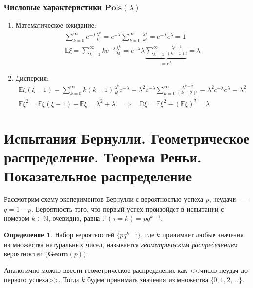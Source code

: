\documentclass[oneside,final,14pt]{extreport}
\newcommand\myprob[1]{{\mathbb{P}(#1)}}
\theoremstyle{plain}
\theoremstyle{definition}
\newtheorem*{defn}{Определение}
\theoremstyle{named}
\begin{document}
\subsubsection{Числовые характеристики $\mathbf{Pois}(\lambda)$}
\begin{enumerate}
    \item Математическое ожидание:
    \begin{align*}
        \sum\limits_{k=0}^{\infty} e^{-\lambda} \frac{\lambda^k}{k!} = e^{-\lambda} \sum\limits_{k=0}^{\infty} \frac{\lambda^k}{k!} = e^{-\lambda} e^\lambda = 1 \\
        \mathbb{E}\xi = \sum\limits_{k=1}^{\infty} k e^{-\lambda} \frac{\lambda^k}{k!} = e^{-\lambda} \lambda \underbrace{\sum\limits_{k=1}^{\infty} \frac{\lambda^{k-1}}{(k - 1)!}}_{= e^\lambda} = \lambda
    \end{align*}
    \item Дисперсия:
    \begin{align*}
        \mathbb{E}\xi(\xi - 1) = \sum\limits_{k=0}^{\infty} k (k - 1) \frac{\lambda^k}{k!} e^{-\lambda}  = \lambda^2 e^{-\lambda} \sum\limits_{k=0}^{\infty} \frac{\lambda^{k-2}}{(k-2)!} = \lambda^2 e^{-\lambda} e^\lambda = \lambda^2 \\
        \mathbb{E}\xi^2 = \mathbb{E}\xi(\xi - 1) + \mathbb{E}\xi = \lambda^2 + \lambda \quad \Rightarrow \quad \mathbb{D}\xi = \mathbb{E}\xi^2 - (\mathbb{E}\xi)^2 = \lambda
    \end{align*}
\end{enumerate}

\section{Испытания Бернулли. Геометрическое распределение. Теорема Реньи. Показательное распределение}
Рассмотрим схему экспериментов Бернулли с вероятностью успеха $p$, неудачи~--- $q = 1 - p$. Вероятность того, что первый успех произойдёт в испытании с номером $k \in \mathbb{N}$, очевидно, равна $\myprob{\tau = k} = pq^{k-1}$.

\begin{defn}
    Набор вероятностей $\{p q^{k-1}\}$, где $k$ принимает любые значения из множества натуральных чисел, называется {\it геометрическим распределением} вероятностей ($\mathbf{Geom}(p)$).
\end{defn}

Аналогично можно ввести геометрическое распределение как <<число неудач до первого успеха>>. Тогда $k$ будем принимать значения из множества $\{0, 1, 2, \ldots\}$.
\end{document}
